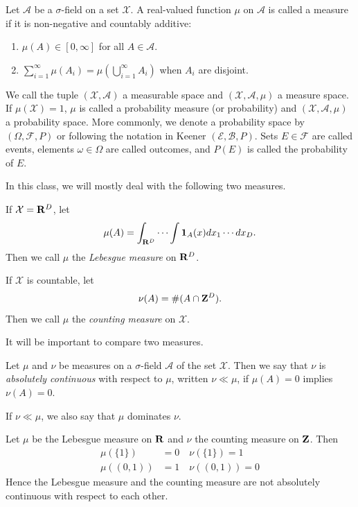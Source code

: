 \documentclass[twoside]{article}
\begin{document}
\begin{definition}\label{def:measure}\citep[Def. 1.4, p.~2]{keener}
  Let $\mathcal A$ be a $\sigma$-field on a set $\mathcal X$.  A real-valued function
  $\mu$ on $\mathcal A$ is called a measure if it is non-negative and countably additive:
  \begin{enumerate}
    \item  $\mu(A) \in [0, \infty]$ for all $A \in \mathcal A$.
    \item $\sum_{i=1}^\infty \mu(A_i) = \mu\left(\bigcup_{i=1}^\infty
      A_i\right)$ when $A_i$ are disjoint.
  \end{enumerate}
  We call the tuple $(\mathcal X, \mathcal A)$ a measurable space and
  $(\mathcal X, \mathcal A, \mu)$ a measure space.  If $\mu(\mathcal X) = 1$,
  $\mu$ is called a probability measure (or probability) and $(\mathcal X, \mathcal A, \mu)$
  a probability space.  More commonly, we denote a probability space by
  $(\Omega, \mathcal F, P)$ or following the notation in Keener $(\mathcal E, \mathcal B, P)$.
  Sets $E \in \mathcal F$ are called events, elements $\omega \in \Omega$
  are called outcomes, and $P(E)$ is called the probability of $E$.
\end{definition}

In this class, we will mostly deal with the following two measures.
\begin{example} 
 If $\mathcal X = \mathbf{R}^D$, let
    \[ \mu(A) = \int_{\mathbf{R}^D} \cdots \int \mathbf{1}_A(x) dx_1 \cdots dx_D. \]
  Then we call $\mu$ the \emph{Lebesgue measure} on $\mathbf{R}^D$.
\end{example}
\begin{example} 
  If $\mathcal X$ is countable, let
    \[ \nu(A) = \#(A \cap \mathbf{Z}^D). \]
  Then we call $\mu$ the \emph{counting measure} on $\mathcal X$.
\end{example}

It will be important to compare two measures.

\begin{definition}\label{def:absolutecontinuity}\citep[Def. 1.9, p.~7]{keener}
  Let $\mu$ and $\nu$ be measures on a $\sigma$-field $\mathcal A$ of the
  set $\mathcal X$. Then we say that $\nu$ is \emph{absolutely continuous} with
  respect to $\mu$, written $\nu \ll \mu$, if
  $\mu(A) = 0$ implies $\nu(A) = 0$.
\end{definition}
If $\nu \ll \mu$, we also say that $\mu$ dominates $\nu$.

\begin{example}  Let $\mu$ be the Lebesgue measure on $\mathbf{R}$ and $\nu$ the counting
  measure on $\mathbf{Z}$.  Then
  \begin{align*}
    \mu(\{1\}) &= 0 \quad \nu(\{1\}) = 1 \\
    \mu((0, 1)) &= 1 \quad \nu((0, 1)) = 0
  \end{align*}
  Hence the Lebesgue measure and the counting measure are not absolutely continuous
  with respect to each other.
\end{example}
\end{document}
